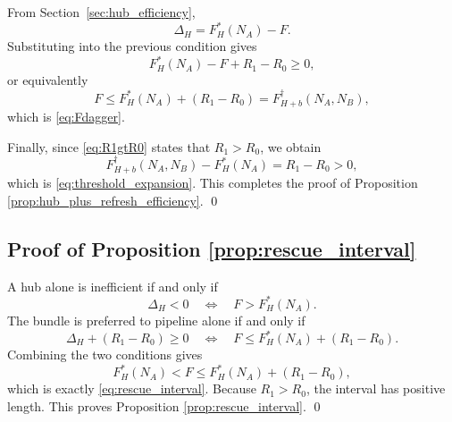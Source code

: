 From Section~\ref{sec:hub_efficiency},
\[
\Delta_H=F_H^*(N_A)-F.
\]
Substituting into the previous condition gives
\[
F_H^*(N_A)-F+R_1-R_0\ge 0,
\]
or equivalently
\[
F\le F_H^*(N_A)+(R_1-R_0)
=
F_{H+b}^{\dagger}(N_A,N_B),
\]
which is \eqref{eq:Fdagger}.

Finally, since \eqref{eq:R1gtR0} states that $R_1>R_0$, we obtain
\[
F_{H+b}^{\dagger}(N_A,N_B)-F_H^*(N_A)=R_1-R_0>0,
\]
which is \eqref{eq:threshold_expansion}. This completes the proof of Proposition \ref{prop:hub_plus_refresh_efficiency}.
\qed

\subsection{Proof of Proposition \ref{prop:rescue_interval}}

A hub alone is inefficient if and only if
\[
\Delta_H<0
\quad\Longleftrightarrow\quad
F>F_H^*(N_A).
\]
The bundle is preferred to pipeline alone if and only if
\[
\Delta_H+(R_1-R_0)\ge 0
\quad\Longleftrightarrow\quad
F\le F_H^*(N_A)+(R_1-R_0).
\]
Combining the two conditions gives
\[
F_H^*(N_A)
<
F
\le
F_H^*(N_A)+(R_1-R_0),
\]
which is exactly \eqref{eq:rescue_interval}. Because $R_1>R_0$, the interval has positive length. This proves Proposition \ref{prop:rescue_interval}.
\qed

